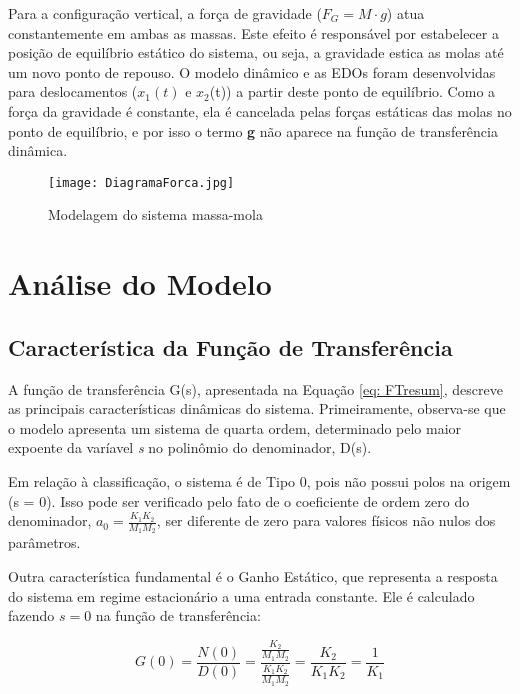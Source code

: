 \documentclass[9pt,a4paper,twocolumn,twoside]{tau-class/tau}
\begin{document}
Para a configuração vertical, a força de gravidade ($F_G = M \cdot g$) atua constantemente em ambas as massas. Este efeito é responsável por estabelecer a posição de equilíbrio estático do sistema, ou seja, a gravidade estica as molas até um novo ponto de repouso. O modelo dinâmico e as EDOs foram desenvolvidas para deslocamentos ($x_1(t)$ e $x_2$(t)) a partir deste ponto de equilíbrio. Como a força da gravidade é constante, ela é cancelada pelas forças estáticas das molas no ponto de equilíbrio, e por isso o termo \textbf{g} não aparece na função de transferência dinâmica.

\begin{figure}[H]
    \centering
    \texttt{[image: DiagramaForca.jpg]}
    \caption{Modelagem do sistema massa-mola}
    \label{fig:MSM}
\end{figure}


\section{Análise do Modelo}

\subsection{Característica da Função de Transferência}
A função de transferência G(s), apresentada na Equação \ref{eq: FTresum}, descreve as principais características dinâmicas do sistema. Primeiramente, observa-se que o modelo apresenta um sistema de quarta ordem, determinado pelo maior expoente da varíavel \textit{s} no polinômio do denominador, D(s).

Em relação à classificação, o sistema é de Tipo 0, pois não possui polos na origem (s = 0). Isso pode ser verificado pelo fato de o coeficiente de ordem zero do denominador, $a_0 = \frac{K_1K_2}{M_1M_2}$, ser diferente de zero para valores físicos não nulos dos parâmetros.

Outra característica fundamental é o Ganho Estático, que representa a resposta do sistema em regime estacionário a uma entrada constante. Ele é calculado fazendo $s = 0$ na função de transferência:

\begin{equation}
    G(0) = \frac{N(0)}{D(0)} = \frac{\frac{K_2}{M_1M_2}}{\frac{K_1K_2}{M_1M_2}} = \frac{K_2}{K_1K_2} = \frac{1}{K_1}
    \label{GE}
\end{equation}
\end{document}
